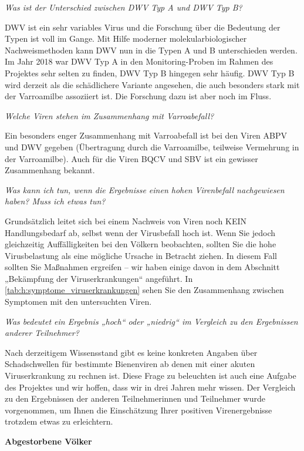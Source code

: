 \textit{Was ist der Unterschied zwischen DWV Typ A und DWV Typ B?}

DWV ist ein sehr variables Virus und die Forschung über die Bedeutung der Typen ist voll im Gange. Mit Hilfe moderner molekularbiologischer Nachweismethoden kann DWV nun in die Typen A und B unterschieden werden. Im Jahr 2018 war DWV Typ A in den Monitoring-Proben im Rahmen des Projektes sehr selten zu finden, DWV Typ B hingegen sehr häufig. DWV Typ B wird derzeit als die schädlichere Variante angesehen, die auch besonders stark mit der Varroamilbe assoziiert ist. Die Forschung dazu ist aber noch im Fluss.

\textit{Welche Viren stehen im Zusammenhang mit Varroabefall?}

Ein besonders enger Zusammenhang mit Varroabefall ist bei den Viren ABPV und DWV gegeben (Übertragung durch die Varroamilbe, teilweise Vermehrung in der Varroamilbe). Auch für die Viren BQCV  und SBV ist ein gewisser Zusammenhang bekannt.

\textit{Was kann ich tun, wenn die Ergebnisse einen hohen Virenbefall nachgewiesen haben? Muss ich etwas tun?}

Grundsätzlich leitet sich bei einem Nachweis von Viren noch KEIN Handlungsbedarf ab, selbst wenn der Virusbefall hoch ist. Wenn Sie jedoch gleichzeitig Auffälligkeiten bei den Völkern beobachten, sollten Sie die hohe Virusbelastung als eine mögliche Ursache in Betracht ziehen. In diesem Fall sollten Sie Maßnahmen ergreifen – wir haben einige davon in dem Abschnitt „Bekämpfung der Viruserkrankungen“ angeführt. In \cref{tab:h:symptome_viruserkrankungen} sehen Sie den Zusammenhang zwischen Symptomen mit den untersuchten Viren.



\textit{Was bedeutet ein Ergebnis „hoch“ oder „niedrig“ im Vergleich zu den Ergebnissen anderer Teilnehmer?}

Nach derzeitigem Wissensstand gibt es keine konkreten Angaben über Schadschwellen für bestimmte Bienenviren ab denen mit einer akuten Viruserkrankung zu rechnen ist. Diese Frage zu beleuchten ist auch eine Aufgabe des Projektes und wir hoffen, dass wir in drei Jahren mehr wissen. Der Vergleich zu den Ergebnissen der anderen Teilnehmerinnen und Teilnehmer wurde vorgenommen, um Ihnen die Einschätzung Ihrer positiven Virenergebnisse trotzdem etwas zu erleichtern.

\textbf{Abgestorbene Völker}

